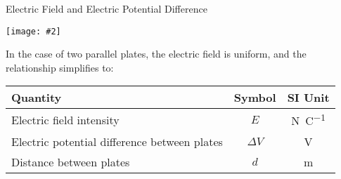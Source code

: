 \documentclass[12pt,aspectratio=169]{beamer}
\newcommand{\pic}[2]{\texttt{[image: \#2]}}
\newcommand{\eq}[2]{\vspace{#1}{\Large\begin{displaymath}#2\end{displaymath}}}
\begin{document}
\begin{frame}{Electric Field and Electric Potential Difference}
  \begin{center}
    \pic{.4}{elfield-600x205.png}
  \end{center}
  \vspace{-.1in}In the case of two parallel plates, the electric field is
  uniform, and the relationship simplifies to:

  \eq{-.2in}{
    \boxed{E=\frac{\Delta V}{d}}
  }
  \begin{center}
    \begin{tabular}{l|c|c}
      \rowcolor{pink}
      \textbf{Quantity} & \textbf{Symbol} & \textbf{SI Unit} \\ \hline
      Electric field intensity & $E$ & \si{\newton\per\coulomb}\\
      Electric potential difference between plates & $\Delta V$ &
      \si{\volt} \\
      Distance between plates       & $d$ & \si{\metre}
    \end{tabular}
  \end{center}
\end{frame}
\end{document}

